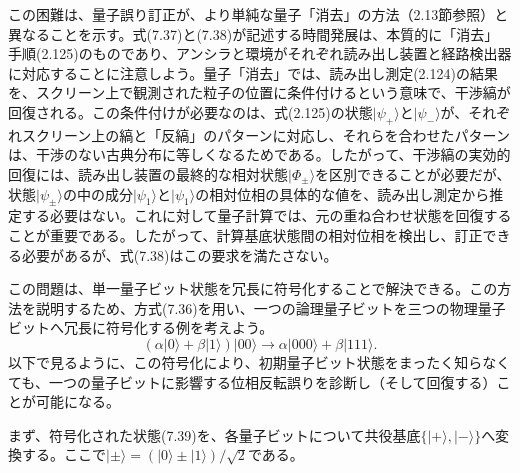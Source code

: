 この困難は、量子誤り訂正が、より単純な量子「消去」の方法（2.13節参照）と異なることを示す。式(7.37)と(7.38)が記述する時間発展は、本質的に「消去」手順(2.125)のものであり、アンシラと環境がそれぞれ読み出し装置と経路検出器に対応することに注意しよう。量子「消去」では、読み出し測定(2.124)の結果を、スクリーン上で観測された粒子の位置に条件付けるという意味で、干渉縞が回復される\cite{ref130}。この条件付けが必要なのは、式(2.125)の状態$|\psi_+\rangle$と$|\psi_-\rangle$が、それぞれスクリーン上の縞と「反縞」のパターンに対応し、それらを合わせたパターンは、干渉のない古典分布に等しくなるためである。したがって、干渉縞の実効的回復には、読み出し装置の最終的な相対状態$|\Phi_\pm\rangle$を区別できることが必要だが、状態$|\psi_\pm\rangle$の中の成分$|\psi_1\rangle$と$|\psi_1\rangle$の相対位相の具体的な値を、読み出し測定から推定する必要はない。これに対して量子計算では、元の重ね合わせ状態を回復することが重要である。したがって、計算基底状態間の相対位相を検出し、訂正できる必要があるが、式(7.38)はこの要求を満たさない。

この問題は、単一量子ビット状態を冗長に符号化することで解決できる。この方法を説明するため、方式(7.36)を用い、一つの論理量子ビットを三つの物理量子ビットへ冗長に符号化する例を考えよう。
\begin{equation}(\alpha|0\rangle+\beta|1\rangle)|00\rangle\longrightarrow\alpha|000\rangle+\beta|111\rangle.\tag{7.39}\end{equation}
以下で見るように、この符号化により、初期量子ビット状態をまったく知らなくても、一つの量子ビットに影響する位相反転誤りを診断し（そして回復する）ことが可能になる。

まず、符号化された状態(7.39)を、各量子ビットについて共役基底$\{|+\rangle,|-\rangle\}$へ変換する。ここで$|\pm\rangle=(|0\rangle\pm|1\rangle)/\sqrt2$である。
